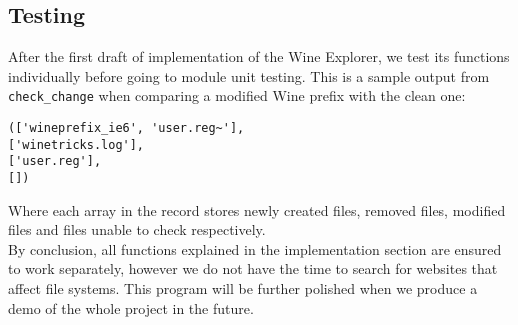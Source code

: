 \subsection{Testing}
After the first draft of implementation of the Wine Explorer, we test its 
functions individually before going to module unit testing. This is a sample 
output from \verb'check_change' when comparing a modified Wine prefix with 
the clean one:
\begin{verbatim}
(['wineprefix_ie6', 'user.reg~'], 
['winetricks.log'], 
['user.reg'], 
[])
\end{verbatim}
Where each array in the record stores newly created files, removed files, 
modified files and files unable to check respectively. \\
By conclusion, all functions 
explained in the implementation section are ensured to work separately, 
however we do not have the time to search for websites that affect file 
systems. This program will be further polished when we produce a demo 
of the whole project in the future. 




